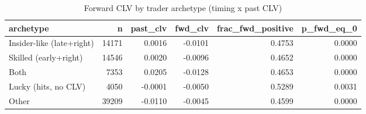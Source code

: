 \begin{table}
\caption{Forward CLV by trader archetype (timing x past CLV)}
\label{tab:insider}
\begin{tabular}{lrrrrr}
\toprule
archetype & n & past_clv & fwd_clv & frac_fwd_positive & p_fwd_eq_0 \\
\midrule
Insider-like (late+right) & 14171 & 0.0016 & -0.0101 & 0.4753 & 0.0000 \\
Skilled (early+right) & 14546 & 0.0020 & -0.0096 & 0.4652 & 0.0000 \\
Both & 7353 & 0.0205 & -0.0128 & 0.4653 & 0.0000 \\
Lucky (hits, no CLV) & 4050 & -0.0001 & -0.0050 & 0.5289 & 0.0031 \\
Other & 39209 & -0.0110 & -0.0045 & 0.4599 & 0.0000 \\
\bottomrule
\end{tabular}
\end{table}
